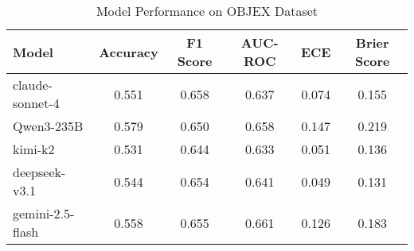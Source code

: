\begin{table}[h]
\centering
\caption{Model Performance on OBJEX Dataset}
\label{tab:main_results}
\begin{tabular}{lccccc}
\toprule
Model & Accuracy & F1 Score & AUC-ROC & ECE & Brier Score \\
\midrule
claude-sonnet-4 & 0.551 & 0.658 & 0.637 & 0.074 & 0.155 \\
Qwen3-235B & 0.579 & 0.650 & 0.658 & 0.147 & 0.219 \\
kimi-k2 & 0.531 & 0.644 & 0.633 & 0.051 & 0.136 \\
deepseek-v3.1 & 0.544 & 0.654 & 0.641 & 0.049 & 0.131 \\
gemini-2.5-flash & 0.558 & 0.655 & 0.661 & 0.126 & 0.183 \\
\bottomrule
\end{tabular}
\end{table}
